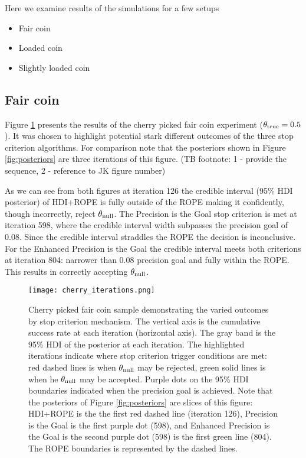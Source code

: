 
Here we examine results of the simulations for a few setups

\begin{itemize}
  \item Fair coin
  \item Loaded coin
  \item Slightly loaded coin
\end{itemize}

\subsection{Fair coin}\label{sec:fair_coin}

Figure \ref{fig:iterations} presents the results of the cherry picked fair coin
experiment ($\theta_{\rm true}=0.5$). It was chosen to highlight potential stark
different outcomes of the three stop criterion algorithms. For comparison note that the posteriors
shown in Figure \ref{fig:posteriors} are three iterations of this figure.
(TB footnote: 1 - provide the sequence, 2 - reference to JK figure number)

As we can see from both figures at iteration 126 the credible interval (95\% HDI posterior) of HDI+ROPE is fully
outside of the ROPE making it confidently, though incorrectly, reject $\theta_{\rm null}$.
The Precision is the Goal stop criterion is met at iteration 598, where the credible
interval width
subpasses the precision goal of 0.08. Since the credible interval straddles the ROPE
the decision is inconclusive.
For the Enhanced Precision is the Goal the credible interval
meets both criterions at iteration 804: narrower than 0.08 precision goal and fully within the ROPE.
This results in correctly accepting $\theta_{\rm null}$.


\begin{figure}[h!]
  \centering
  \texttt{[image: cherry\_iterations.png]}
  \caption{Cherry picked fair coin sample demonstrating the varied outcomes by
  stop criterion mechanism. The vertical axis is the cumulative success rate
  at each iteration (horizontal axis).
  The gray band is the 95\% HDI of the posterior at each iteration.
  The highlighted iterations indicate where stop criterion trigger conditions are met:
  red dashed lines is when  $\theta_{\rm null}$ may be rejected, green solid lines
  is when he $\theta_{\rm null}$ may be accepted. Purple dots on the 95\% HDI boundaries
  indicated when the precision goal is achieved. Note that the posteriors of Figure \ref{fig:posteriors}
  are slices of this figure: HDI+ROPE is the the first red dashed line (iteration 126),
  Precision is the Goal is the first purple dot (598), and Enhanced Precision is the Goal is the second purple dot (598)
  is the first green line (804). The ROPE boundaries is represented by the dashed lines.
  }
  \label{fig:iterations}
\end{figure}

